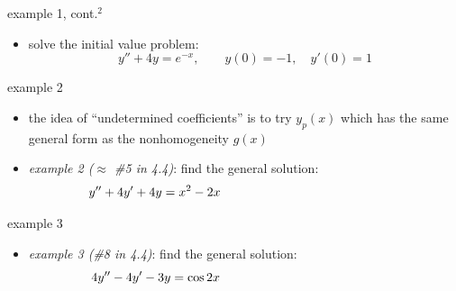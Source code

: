 \documentclass{beamer}
\begin{document}
\begin{frame}{example 1, cont.$^2$}

\begin{itemize}
\item solve the initial value problem:
    $$y'' + 4 y = e^{-x}, \qquad y(0)=-1, \quad y'(0)=1$$

\vspace{60mm}
\end{itemize}
\end{frame}


\begin{frame}{example 2}

\begin{itemize}
\item the idea of ``undetermined coefficients'' is to \alert{try $y_p(x)$ which has the same general form as the nonhomogeneity $g(x)$}
\item \emph{example 2 ($\approx$ \#5 in 4.4)}: find the general solution:
    $$y'' + 4 y' + 4y = x^2 - 2 x \hspace{50mm}$$
\end{itemize}

\vspace{50mm}
\end{frame}


\begin{frame}{example 3}

\begin{itemize}
\item \emph{example 3 (\#8 in 4.4)}: find the general solution:
    $$4 y'' - 4 y' - 3 y = \cos 2x \hspace{50mm}$$
\end{itemize}

\vspace{60mm}
\end{frame}
\end{document}

